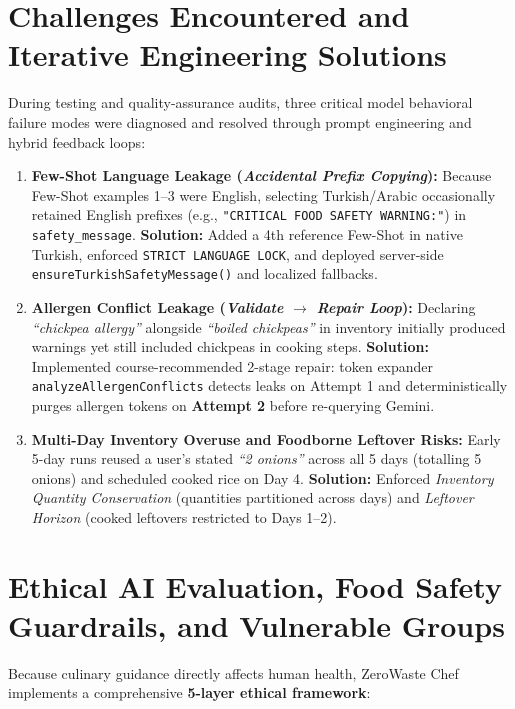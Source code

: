 \documentclass[9pt,a4paper]{article}
\begin{document}
\section{Challenges Encountered and Iterative Engineering Solutions}
During testing and quality-assurance audits, three critical model behavioral failure modes were diagnosed and resolved through prompt engineering and hybrid feedback loops:
\begin{enumerate}
  \item \textbf{Few-Shot Language Leakage (\emph{Accidental Prefix Copying}):} Because Few-Shot examples 1--3 were English, selecting Turkish/Arabic occasionally retained English prefixes (e.g., \texttt{"CRITICAL FOOD SAFETY WARNING:"}) in \texttt{safety\_message}. \textbf{Solution:} Added a 4th reference Few-Shot in native Turkish, enforced \texttt{STRICT LANGUAGE LOCK}, and deployed server-side \texttt{ensureTurkishSafetyMessage()} and localized fallbacks.
  \item \textbf{Allergen Conflict Leakage (\emph{Validate $\rightarrow$ Repair Loop}):} Declaring \emph{``chickpea allergy''} alongside \emph{``boiled chickpeas''} in inventory initially produced warnings yet still included chickpeas in cooking steps. \textbf{Solution:} Implemented course-recommended 2-stage repair: token expander \texttt{analyzeAllergenConflicts} detects leaks on Attempt 1 and deterministically purges allergen tokens on \textbf{Attempt 2} before re-querying Gemini.
  \item \textbf{Multi-Day Inventory Overuse and Foodborne Leftover Risks:} Early 5-day runs reused a user's stated \emph{``2 onions''} across all 5 days (totalling 5 onions) and scheduled cooked rice on Day 4. \textbf{Solution:} Enforced \emph{Inventory Quantity Conservation} (quantities partitioned across days) and \emph{Leftover Horizon} (cooked leftovers restricted to Days 1--2).
\end{enumerate}

\section{Ethical AI Evaluation, Food Safety Guardrails, and Vulnerable Groups}
Because culinary guidance directly affects human health, ZeroWaste Chef implements a comprehensive \textbf{5-layer ethical framework}:
\end{document}
